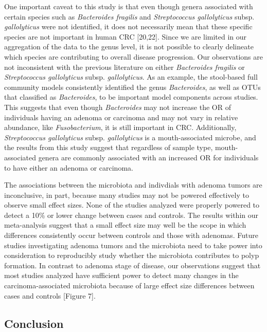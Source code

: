 \documentclass[12pt,]{article}
\begin{document}
One important caveat to this study is that even though genera associated
with certain species such as \emph{Bacteroides fragilis} and
\emph{Streptococcus gallolyticus} subsp. \emph{gallolyticus} were not
identified, it does not necessarily mean that these specific species are
not important in human CRC {[}20,22{]}. Since we are limited in our
aggregation of the data to the genus level, it is not possible to
clearly delineate which species are contributing to overall disease
progression. Our observations are not inconsistent with the previous
literature on either \emph{Bacteroides fragilis} or \emph{Streptococcus
gallolyticus} subsp. \emph{gallolyticus}. As an example, the stool-based
full community models consistently identified the genus
\emph{Bacteroides}, as well as OTUs that classified as
\emph{Bacteroides}, to be important model components across studies.
This suggests that even though \emph{Bacteroides} may not increase the
OR of individuals having an adenoma or carcinoma and may not vary in
relative abundance, like \emph{Fusobacterium}, it is still important in
CRC. Additionally, \emph{Streptococcus gallolyticus} subsp.
\emph{gallolyticus} is a mouth-associated microbe, and the results from
this study suggest that regardless of sample type, mouth-associated
genera are commonly associated with an increased OR for individuals to
have either an adenoma or carcinoma.

The associations between the microbiota and indivdials with adenoma
tumors are inconclusive, in part, because many studies may not be
powered effectively to observe small effect sizes. None of the studies
analyzed were properly powered to detect a 10\% or lower change between
cases and controls. The results within our meta-analysis suggest that a
small effect size may well be the scope in which differences
consistently occur between controls and those with adenomas. Future
studies investigating adenoma tumors and the microbiota need to take
power into consideration to reproducibly study whether the microbiota
contributes to polyp formation. In contrast to adenoma stage of disease,
our observations suggest that most studies analyzed have sufficient
power to detect many changes in the carcinoma-associated microbiota
because of large effect size differences between cases and controls
{[}Figure 7{]}.

\newpage

\subsection{Conclusion}\label{conclusion}
\end{document}
